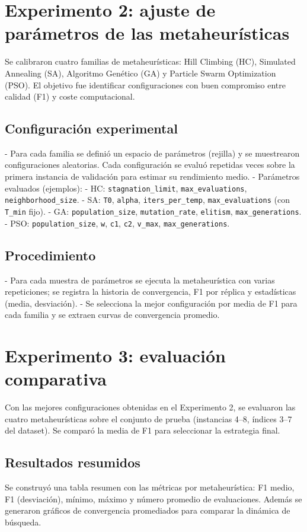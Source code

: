 \section{Experimento 2: ajuste de parámetros de las metaheurísticas}
\label{sec:exp2}
Se calibraron cuatro familias de metaheurísticas: Hill Climbing (HC), Simulated Annealing (SA), Algoritmo Genético (GA) y Particle Swarm Optimization (PSO). El objetivo fue identificar configuraciones con buen compromiso entre calidad (F1) y coste computacional.

\subsection{Configuración experimental}
- Para cada familia se definió un espacio de parámetros (rejilla) y se muestrearon configuraciones aleatorias. Cada configuración se evaluó repetidas veces sobre la primera instancia de validación para estimar su rendimiento medio.
- Parámetros evaluados (ejemplos):
  - HC: \texttt{stagnation\_limit}, \texttt{max\_evaluations}, \texttt{neighborhood\_size}.
  - SA: \texttt{T0}, \texttt{alpha}, \texttt{iters\_per\_temp}, \texttt{max\_evaluations} (con \texttt{T\_min} fijo).
  - GA: \texttt{population\_size}, \texttt{mutation\_rate}, \texttt{elitism}, \texttt{max\_generations}.
  - PSO: \texttt{population\_size}, \texttt{w}, \texttt{c1}, \texttt{c2}, \texttt{v\_max}, \texttt{max\_generations}.

\subsection{Procedimiento}
- Para cada muestra de parámetros se ejecuta la metaheurística con varias repeticiones; se registra la historia de convergencia, F1 por réplica y estadísticas (media, desviación).
- Se selecciona la mejor configuración por media de F1 para cada familia y se extraen curvas de convergencia promedio.

\section{Experimento 3: evaluación comparativa}
\label{sec:exp3}
Con las mejores configuraciones obtenidas en el Experimento 2, se evaluaron las cuatro metaheurísticas sobre el conjunto de prueba (instancias 4–8, índices 3–7 del dataset). Se comparó la media de F1 para seleccionar la estrategia final.

\subsection{Resultados resumidos}
Se construyó una tabla resumen con las métricas por metaheurística: F1 medio, F1 (desviación), mínimo, máximo y número promedio de evaluaciones. Además se generaron gráficos de convergencia promediados para comparar la dinámica de búsqueda.

